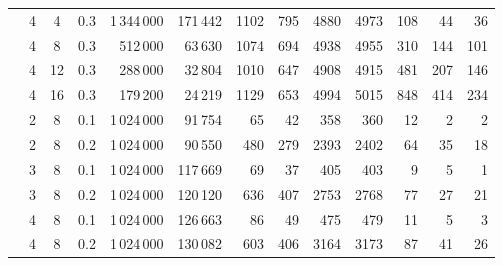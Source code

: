 \begin{tabular}{@{}ccccrrrrrrrrr@{}}
 & 4 & 4 & 0.3 & 1\,344\,000 & 171\,442 & 1102 & 795 & 4880 & 4973 & 108 & 44 & 36 \\
 & 4 & 8 & 0.3 & 512\,000 & 63\,630 & 1074 & 694 & 4938 & 4955 & 310 & 144 & 101 \\
 & 4 & 12 & 0.3 & 288\,000 & 32\,804 & 1010 & 647 & 4908 & 4915 & 481 & 207 & 146 \\
 & 4 & 16 & 0.3 & 179\,200 & 24\,219 & 1129 & 653 & 4994 & 5015 & 848 & 414 & 234 \\
 & 2 & 8 & 0.1 & 1\,024\,000 & 91\,754 & 65 & 42 & 358 & 360 & 12 & 2 & 2 \\
 & 2 & 8 & 0.2 & 1\,024\,000 & 90\,550 & 480 & 279 & 2393 & 2402 & 64 & 35 & 18 \\
 & 3 & 8 & 0.1 & 1\,024\,000 & 117\,669 & 69 & 37 & 405 & 403 & 9 & 5 & 1 \\
 & 3 & 8 & 0.2 & 1\,024\,000 & 120\,120 & 636 & 407 & 2753 & 2768 & 77 & 27 & 21 \\
 & 4 & 8 & 0.1 & 1\,024\,000 & 126\,663 & 86 & 49 & 475 & 479 & 11 & 5 & 3 \\
 & 4 & 8 & 0.2 & 1\,024\,000 & 130\,082 & 603 & 406 & 3164 & 3173 & 87 & 41 & 26 \\
\bottomrule
\end{tabular}
